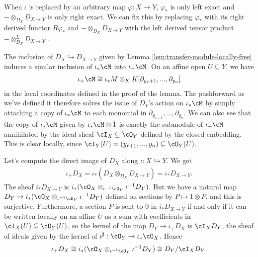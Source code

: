 \begin{rmk}\label{rmk:derived-direct-image}
	When $\iota$ is replaced by an arbitrary map $\varphi:X\to Y$, $\varphi_*$ is only left exact and $-\otimes_{D_X} D_{X\to Y}$ is only right exact. We can fix this by replacing $\varphi_*$ with its right derived functor $R\varphi_*$ and $-\otimes_{D_X} D_{X\to Y}$ with the left derived tensor product $-\otimes^L_{D_X} D_{X\to Y}$ \cite{d-mod_ps-rt}.
\end{rmk}
\begin{rmk}\label{rmk:local-presentation-of-pushforward}
	The inclusion of $D_X\hookrightarrow D_{X\to Y}$ given by Lemma \ref{lem:transfer-module-locally-free} induces a similar inclusion of $\iota_*\cM$ into $\iota_+\cM$. On an affine open $U\subseteq Y$,  we have
	\begin{align*}
		\iota_+\cM \cong \iota_*M \otimes_K K[\partial_{y_r+1},...,\partial_{y_n}]
	\end{align*}
	in the local coordinates defined in the proof of the lemma. The pushforward as we've defined it therefore solves the issue of $D_Y$'s action on $\iota_*\cM$ by simply attaching a copy of $\iota_*\cM$ to each monomial in $\partial_{y_{r+1}},...,\partial_{y_n}$. We can also see that the copy of $\iota_*\cM$ given by $\iota_*\cM\otimes \hat{1}$ is exactly the submodule of $\iota_+\cM$ annihilated by the ideal sheaf $\cI_X \subseteq \cO_Y$ defined by the closed embedding. This is clear locally, since $\cI_Y(U) = (y_{r+1},...,y_n) \subseteq \cO_Y(U)$.
\end{rmk}
\begin{example}\label{example:pushforward-of-diff-ops}
	Let's compute the direct image of $D_X$ along $\iota:X\hookrightarrow Y$. We get
	\begin{align*}
		\iota_+D_X = \iota_*\left(D_X\otimes_{D_X} D_{X\to Y}\right) = \iota_*D_{X\to Y}.
	\end{align*}
	The sheaf $i_*D_{X\to Y}$ is $i_*(\cO_X\otimes_{\iota^{-1}\cO_Y} \iota^{-1} D_Y)$. But we have a natural map $D_Y\to i_*(\cO_X\otimes_{\iota^{-1}\cO_Y} \iota^{-1} D_Y)$ defined on sections by $P\mapsto 1\otimes P$, and this is surjective. Furthermore, a section $P$ is sent to 0 in $i_*D_{X\to Y}$ if and only if it can be written locally on an affine $U$ as a sum with coefficients in $\cI_X(U) \subseteq \cO_Y(U)$, so the kernel of the map $D_Y\to \iota_+D_X$ is $\cI_X D_Y$, the sheaf of ideals given by the kernel of $\iota^{\sharp}:\cO_Y\to \iota_*\cO_X$. Hence
	\begin{align*}
		\iota_+D_X \cong i_*(\cO_X\otimes_{\iota^{-1}\cO_Y} \iota^{-1} D_Y) \cong D_Y/\cI_XD_Y.
	\end{align*}
\end{example}
